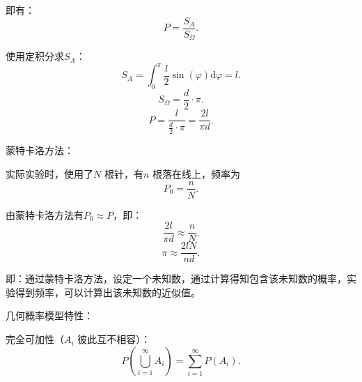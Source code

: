 \begin{eg}
\begin{figure}[htbp]
    \end{figure}

    即有：\[
        P=\frac{S_A}{S_\Omega}
    .\] 

    使用定积分求$S_A$：
     \[
        S_A=\int_{0}^{\pi} \frac{l}{2}\sin\left( \varphi \right)  \mathrm{d}\varphi=l
    .\]
    \[
        S_\Omega=\frac{d}{2}\cdot \pi
    .\] 
    \[
        P=\frac{l}{\frac{d}{2}\cdot \pi}=\frac{2l}{\pi d}
    .\] 
\end{eg}
\begin{remark}
    蒙特卡洛方法：
    
    实际实验时，使用了$N$ 根针，有$n$ 根落在线上，频率为\[
        P_0=\frac{n}{N}
    .\] 

    由蒙特卡洛方法有$P_0\approx P$，即：
    \[
        \frac{2l}{\pi d}\approx \frac{n}{N}
    .\]
    \[
        \pi \approx \frac{2lN}{nd}
    .\]     
    
    即：通过蒙特卡洛方法，设定一个未知数，通过计算得知包含该未知数的概率，实验得到频率，可以计算出该未知数的近似值。
\end{remark}
\begin{notation}
    几何概率模型特性：
    
    完全可加性（$A_i$ 彼此互不相容）：\[
        P\left( \bigcup_{i=1}^{\infty}A_i \right) =\sum_{i=1}^{\infty} P\left( A_i \right) 
    .\] 
\end{notation}
